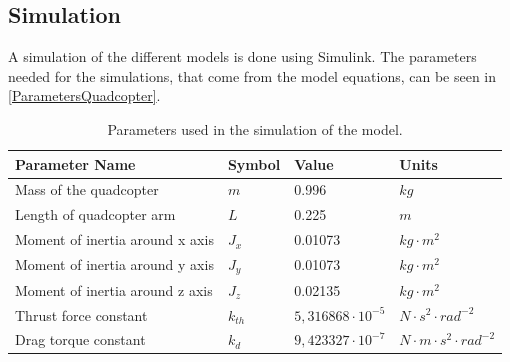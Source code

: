 \subsection{Simulation}
A simulation of the different models is done using Simulink. The parameters needed for the simulations, that come from the model equations, can be seen in \autoref{ParametersQuadcopter}.
\begin{table}[H]
	\centering
	\begin{tabular}{|l|l|l|p{3cm}|}
		\hline %
		\textbf{Parameter Name}&\textbf{Symbol} &\textbf{Value} &\textbf{Units}\\
		\hline %
		Mass of the quadcopter  & $m$ & 0.996       &$kg$\\
		\hline %
        Length of quadcopter arm       & $L$  &   0.225       & $m$\\
        \hline %
		Moment of inertia around x axis       & $J_x$  & 0.01073       & $kg \cdot m^2$\\
		\hline %
		Moment of inertia around y axis       & $J_y$  & 0.01073       & $kg \cdot m^2$\\
		\hline %
		Moment of inertia around z axis       & $J_z$  & 0.02135       & $kg \cdot m^2$\\
		\hline %
		Thrust force constant       & $k_{th}$  & $5,316868\cdot10^{-5}$       & $N \cdot s^2 \cdot rad^{-2}$\\
		\hline %
		Drag torque constant      & $k_{d}$  & $9,423327\cdot10^{-7}$       & $N \cdot m \cdot s^2 \cdot rad^{-2}$\\
		\hline %
	\end{tabular}
	\caption{Parameters used in the simulation of the model.}
	\label{ParametersQuadcopter}
\end{table}\vspace{-18pt}


